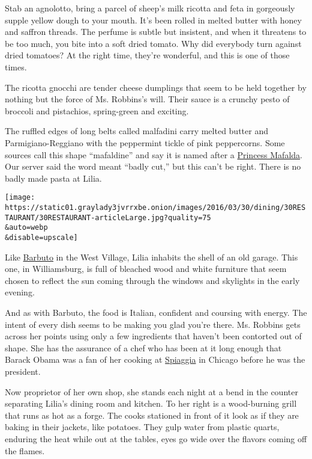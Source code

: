 Stab an agnolotto, bring a parcel of sheep's milk ricotta and feta in
gorgeously supple yellow dough to your mouth. It's been rolled in melted
butter with honey and saffron threads. The perfume is subtle but
insistent, and when it threatens to be too much, you bite into a soft
dried tomato. Why did everybody turn against dried tomatoes? At the
right time, they're wonderful, and this is one of those times.

The ricotta gnocchi are tender cheese dumplings that seem to be held
together by nothing but the force of Ms. Robbins's will. Their sauce is
a crunchy pesto of broccoli and pistachios, spring-green and exciting.

The ruffled edges of long belts called malfadini carry melted butter and
Parmigiano-Reggiano with the peppermint tickle of pink peppercorns. Some
sources call this shape ``mafaldine'' and say it is named after a
\href{http://jenniwiltz.com/the-princess-in-the-concentration-camp/}{Princess
Mafalda}. Our server said the word meant ``badly cut,'' but this can't
be right. There is no badly made pasta at Lilia.

\texttt{[image: https://static01.graylady3jvrrxbe.onion/images/2016/03/30/dining/30RESTAURANT/30RESTAURANT-articleLarge.jpg?quality=75\\\&auto=webp\\\&disable=upscale]}

Like
\href{http://www.nytimes3xbfgragh.onion/2008/01/09/dining/reviews/09rest.html}{Barbuto}
in the West Village, Lilia inhabits the shell of an old garage. This
one, in Williamsburg, is full of bleached wood and white furniture that
seem chosen to reflect the sun coming through the windows and skylights
in the early evening.

And as with Barbuto, the food is Italian, confident and coursing with
energy. The intent of every dish seems to be making you glad you're
there. Ms. Robbins gets across her points using only a few ingredients
that haven't been contorted out of shape. She has the assurance of a
chef who has been at it long enough that Barack Obama was a fan of her
cooking at \href{http://www.spiaggiarestaurant.com/}{Spiaggia} in
Chicago before he was the president.

Now proprietor of her own shop, she stands each night at a bend in the
counter separating Lilia's dining room and kitchen. To her right is a
wood-burning grill that runs as hot as a forge. The cooks stationed in
front of it look as if they are baking in their jackets, like potatoes.
They gulp water from plastic quarts, enduring the heat while out at the
tables, eyes go wide over the flavors coming off the flames.

